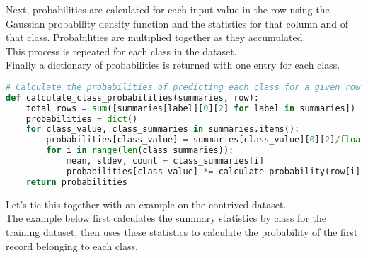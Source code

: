 \documentclass[12pt]{article}
\begin{document}
Next, probabilities are calculated for each input value in the row using the Gaussian probability density function and the statistics for that column and of that class. Probabilities are multiplied together as they accumulated.\\

This process is repeated for each class in the dataset.\\

Finally a dictionary of probabilities is returned with one entry for each class.\\

\begin{lstlisting}[language=python]
# Calculate the probabilities of predicting each class for a given row
def calculate_class_probabilities(summaries, row):
	total_rows = sum([summaries[label][0][2] for label in summaries])
	probabilities = dict()
	for class_value, class_summaries in summaries.items():
		probabilities[class_value] = summaries[class_value][0][2]/float(total_rows)
		for i in range(len(class_summaries)):
			mean, stdev, count = class_summaries[i]
			probabilities[class_value] *= calculate_probability(row[i], mean, stdev)
	return probabilities

\end{lstlisting}

Let's tie this together with an example on the contrived dataset.\\

The example below first calculates the summary statistics by class for the training dataset, then uses these statistics to calculate the probability of the first record belonging to each class.
\end{document}
